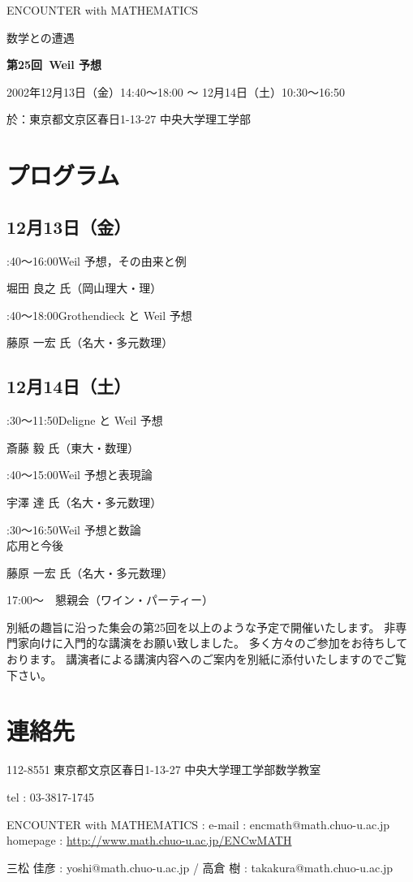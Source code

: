 \documentclass[uplatex,dvipdfmx]{jlreq}
\newcommand{\talk}[3]{%
\noindent
#1\quad #2\par
\hspace*{2em}#3\par\smallskip
}
\newcommand{\EwMnumber}{第25回}
\newcommand{\EwMtitle}{Weil 予想}
\newcommand{\EwMdate}{2002年12月13日（金）14:40～18:00 ～ 12月14日（土）10:30～16:50}
\newcommand{\EwMplace}{東京都文京区春日1-13-27 中央大学理工学部}
\newcommand{\EwMtitleblock}{

\vspace*{-5mm}

\begin{center}

{\Large ENCOUNTER with MATHEMATICS}

\vspace{2mm}

{\large 数学との遭遇}

\vspace{4mm}

{\Large \bfseries \EwMnumber\ \EwMtitle}

\vspace{4mm}

\EwMdate

\vspace{2mm}

於：\EwMplace

\end{center}

\vspace{2mm}

}
\begin{document}
\EwMtitleblock


\section*{プログラム}

\subsection*{12月13日（金）}

\talk
{14:40～16:00}
{Weil 予想，その由来と例}
{堀田 良之 氏（岡山理大・理）}

\talk
{16:40～18:00}
{Grothendieck と Weil 予想}
{藤原 一宏 氏（名大・多元数理）}

\subsection*{12月14日（土）}

\talk
{10:30～11:50}
{Deligne と Weil 予想}
{斎藤 毅 氏（東大・数理）}

\talk
{13:40～15:00}
{Weil 予想と表現論}
{宇澤 達 氏（名大・多元数理）}

\talk
{15:30～16:50}
{Weil 予想と数論\\[1mm]応用と今後}
{藤原 一宏 氏（名大・多元数理）}

\bigskip

17:00～　懇親会（ワイン・パーティー）


\bigskip

別紙の趣旨に沿った集会の第25回を以上のような予定で開催いたします。  
非専門家向けに入門的な講演をお願い致しました。  
多く方々のご参加をお待ちしております。  
講演者による講演内容へのご案内を別紙に添付いたしますのでご覧下さい。


\section*{連絡先}

112-8551 東京都文京区春日1-13-27 中央大学理工学部数学教室 

tel : 03-3817-1745  

ENCOUNTER with MATHEMATICS : e-mail : encmath@math.chuo-u.ac.jp  
homepage : \url{http://www.math.chuo-u.ac.jp/ENCwMATH}  

三松 佳彦 : yoshi@math.chuo-u.ac.jp / 高倉 樹 : takakura@math.chuo-u.ac.jp
\end{document}
